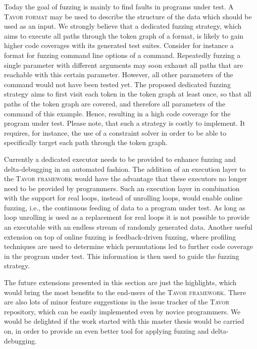 Today the goal of fuzzing is mainly to find faults in programs under test. A \textsc{Tavor format} may be used to describe the structure of the data which should be used as an input. We strongly believe that a dedicated fuzzing strategy, which aims to execute all paths through the token graph of a format, is likely to gain higher code coverages with its generated test suites. Consider for instance a format for fuzzing command line options of a command. Repeatedly fuzzing a single parameter with different arguments may soon exhaust all paths that are reachable with this certain parameter. However, all other parameters of the command would not have been tested yet. The proposed dedicated fuzzing strategy aims to first visit each token in the token graph at least once, so that all paths of the token graph are covered, and therefore all parameters of the command of this example. Hence, resulting in a high code coverage for the program under test. Please note, that such a strategy is costly to implement. It requires, for instance, the use of a constraint solver in order to be able to specifically target each path through the token graph.

Currently a dedicated executor needs to be provided to enhance fuzzing and delta-debugging in an automated fashion. The addition of an execution layer to the \textsc{Tavor framework} would have the advantage that these executors no longer need to be provided by programmers. Such an execution layer in combination with the support for real loops, instead of unrolling loops, would enable online fuzzing, i.e., the continuous feeding of data to a program under test. As long as loop unrolling is used as a replacement for real loops it is not possible to provide an executable with an endless stream of randomly generated data. Another useful extension on top of online fuzzing is feedback-driven fuzzing, where profiling techniques are used to determine which permutations led to further code coverage in the program under test. This information is then used to guide the fuzzing strategy.

The future extensions presented in this section are just the highlights, which would bring the most benefits to the end-users of the \textsc{Tavor framework}. There are also lots of minor feature suggestions in the issue tracker of the \textsc{Tavor} repository, which can be easily implemented even by novice programmers. We would be delighted if the work started with this master thesis would be carried on, in order to provide an even better tool for applying fuzzing and delta-debugging.
